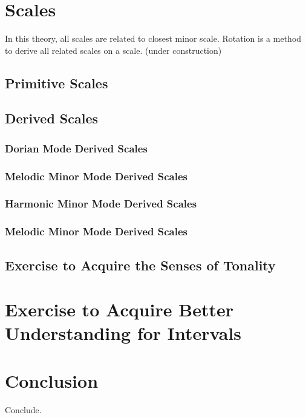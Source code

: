 \documentclass[a4paper]{article}
\begin{document}
\section{Scales}

In this theory, all scales are related to closest minor scale. Rotation is a method to derive all related scales on a scale. (under construction)\\

\subsection { Primitive Scales }


\subsection { Derived Scales }

\subsubsection { Dorian Mode Derived Scales }

\subsubsection { Melodic Minor Mode Derived Scales }

\subsubsection { Harmonic Minor Mode Derived Scales }

\subsubsection { Melodic Minor \sharp Mode Derived Scales }


\subsection { Exercise to Acquire the Senses of Tonality}



\section{Exercise to Acquire Better Understanding for Intervals}


\section{Conclusion}
Conclude. %
\end{document}
